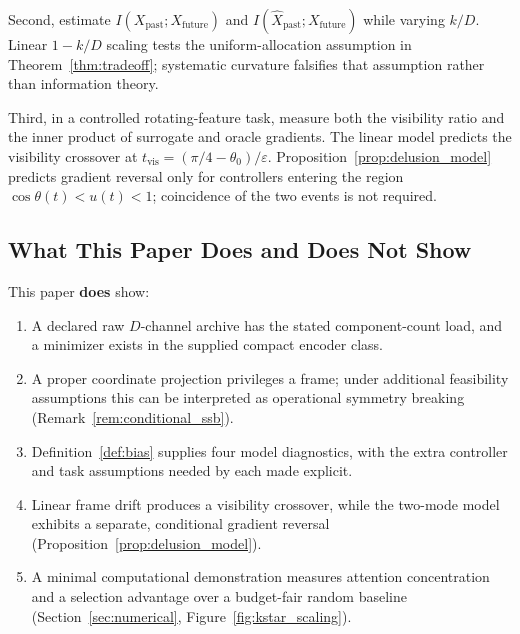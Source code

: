 \documentclass[12pt]{article}
\begin{document}
Second, estimate
$I(X_{\mathrm{past}};X_{\mathrm{future}})$ and
$I(\hat X_{\mathrm{past}};X_{\mathrm{future}})$ while varying $k/D$.
Linear $1-k/D$ scaling tests the uniform-allocation assumption in
Theorem~\ref{thm:tradeoff}; systematic curvature falsifies that
assumption rather than information theory.

Third, in a controlled rotating-feature task, measure both the visibility
ratio and the inner product of surrogate and oracle gradients.  The
linear model predicts the visibility crossover at
$t_{\mathrm{vis}}=(\pi/4-\theta_0)/\varepsilon$.  Proposition~\ref{prop:delusion_model}
predicts gradient reversal only for controllers entering the region
$\cos\theta(t)<u(t)<1$; coincidence of the two events is not required.

\subsection{What This Paper Does and Does Not Show}
\label{subsec:claims}

This paper \textbf{does} show:
\begin{enumerate}
\item A declared raw $D$-channel archive has the stated component-count
  load, and a minimizer exists in the supplied compact encoder class.
\item A proper coordinate projection privileges a frame; under additional
  feasibility assumptions this can be interpreted as operational symmetry
  breaking (Remark~\ref{rem:conditional_ssb}).
\item Definition~\ref{def:bias} supplies four model diagnostics, with the
  extra controller and task assumptions needed by each made explicit.
\item Linear frame drift produces a visibility crossover, while the
  two-mode model exhibits a separate, conditional gradient reversal
  (Proposition~\ref{prop:delusion_model}).
\item A minimal computational demonstration measures attention
  concentration and a selection advantage over a budget-fair random baseline
  (Section~\ref{sec:numerical},
  Figure~\ref{fig:kstar_scaling}).
\end{enumerate}
\end{document}
